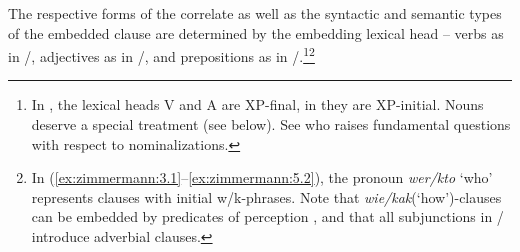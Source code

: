 \documentclass[output=paper]{langscibook}
\begin{document}
The respective forms of the correlate as well as the syntactic and semantic types of the embedded clause are determined by the embedding lexical head -- verbs as in /, adjectives as in /, and prepositions as in /.\footnote{In , the lexical heads V and A are XP-final, in  they are XP-initial. Nouns deserve a special treatment (see below). See \citet{Knjazev2016} who raises fundamental questions with respect to nominalizations.}\footnote{In (\ref{ex:zimmermann:3.1}--\ref{ex:zimmermann:5.2}), the pronoun \textit{wer/kto} `who' represents clauses with initial w/k-phrases. Note that \textit{wie/kak}(`how')-clauses can be embedded by predicates of perception \citep[see][]{Zimmermann1991}, and that all subjunctions in / introduce adverbial clauses.}\largerpage[-2]
\end{document}
